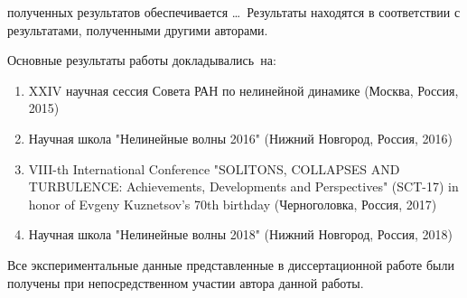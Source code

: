{\reliability} полученных результатов обеспечивается \ldots \ Результаты находятся в соответствии с результатами, полученными другими авторами.


{\probation}
Основные результаты работы докладывались~на:
\begin{enumerate}
	\item XXIV научная сессия Совета РАН по нелинейной динамике (Москва, Россия, 2015)
	\item Научная школа "Нелинейные волны 2016" (Нижний Новгород, Россия, 2016)
	\item VIII-th International Conference "SOLITONS, COLLAPSES AND TURBULENCE: Achievements, Developments and Perspectives" (SCT-17) in honor of Evgeny Kuznetsov's 70th birthday (Черноголовка, Россия, 2017)
	\item Научная школа "Нелинейные волны 2018" (Нижний Новгород, Россия, 2018)

\end{enumerate}


{\contribution} Все экспериментальные данные представленные в диссертационной работе были получены при непосредственном участии автора данной работы.


